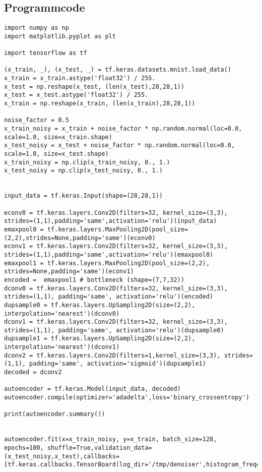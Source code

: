 \begin{appendices}
\chapter{Programmcode}

\begin{verbatim}
import numpy as np
import matplotlib.pyplot as plt

import tensorflow as tf

(x_train, _), (x_test, _) = tf.keras.datasets.mnist.load_data()
x_train = x_train.astype('float32') / 255.
x_test = np.reshape(x_test, (len(x_test),28,28,1))
x_test = x_test.astype('float32') / 255.
x_train = np.reshape(x_train, (len(x_train),28,28,1))

noise_factor = 0.5
x_train_noisy = x_train + noise_factor * np.random.normal(loc=0.0, scale=1.0, size=x_train.shape)
x_test_noisy = x_test + noise_factor * np.random.normal(loc=0.0, scale=1.0, size=x_test.shape)
x_train_noisy = np.clip(x_train_noisy, 0., 1.)
x_test_noisy = np.clip(x_test_noisy, 0., 1.)


input_data = tf.keras.Input(shape=(28,28,1))

econv0 = tf.keras.layers.Conv2D(filters=32, kernel_size=(3,3), strides=(1,1),padding='same',activation='relu')(input_data)
emaxpool0 = tf.keras.layers.MaxPooling2D(pool_size=(2,2),strides=None,padding='same')(econv0)
econv1 = tf.keras.layers.Conv2D(filters=32, kernel_size=(3,3), strides=(1,1),padding='same',activation='relu')(emaxpool0)
emaxpool1 = tf.keras.layers.MaxPooling2D(pool_size=(2,2), strides=None,padding='same')(econv1)
encoded =  emaxpool1 # bottleneck (shape=(7,7,32))
dconv0 = tf.keras.layers.Conv2D(filters=32, kernel_size=(3,3), strides=(1,1), padding='same', activation='relu')(encoded)
dupsample0 = tf.keras.layers.UpSampling2D(size=(2,2), interpolation='nearest')(dconv0)
dconv1 = tf.keras.layers.Conv2D(filters=32, kernel_size=(3,3), strides=(1,1), padding='same', activation='relu')(dupsample0)
dupsample1 = tf.keras.layers.UpSampling2D(size=(2,2), interpolation='nearest')(dconv1)
dconv2 = tf.keras.layers.Conv2D(filters=1,kernel_size=(3,3), strides=(1,1), padding='same', activation='sigmoid')(dupsample1)
decoded = dconv2

autoencoder = tf.keras.Model(input_data, decoded)
autoencoder.compile(optimizer='adadelta',loss='binary_crossentropy')

print(autoencoder.summary())


autoencoder.fit(x=x_train_noisy, y=x_train, batch_size=128, epochs=100, shuffle=True,validation_data=(x_test_noisy,x_test),callbacks=[tf.keras.callbacks.TensorBoard(log_dir='/tmp/denoiser',histogram_freq=0,write_graph=False)])


\end{verbatim}
\end{appendices}
